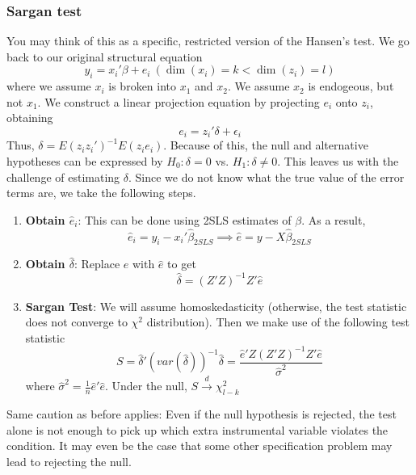 \documentclass[12pt]{article}
\theoremstyle{definition}
\theoremstyle{property}
\theoremstyle{assumption}
\theoremstyle{example}
\theoremstyle{comment}
\begin{document}
\subsubsection{Sargan test}
You may think of this as a specific, restricted version of the Hansen's test. We go back to our original structural equation
\[
y_i = x_i'\beta+e_i \ (\dim(x_i)=k<\dim(z_i)=l) 
\]
where we assume $x_i$ is broken into $x_1$ and $x_2$. We assume $x_2$ is endogeous, but not $x_1$. We construct a linear projection equation by projecting $e_i$ onto $z_i$, obtaining
\[
e_i=z_i'\delta+\epsilon_i
\]
Thus, $\delta=E(z_iz_i')^{-1}E(z_ie_i)$.  Because of this, the null and alternative hypotheses can be expressed by $H_0: \delta=0$ vs. $H_1: \delta\neq0$. This leaves us with the challenge of estimating $\delta$.  Since we do not know what the true value of the error terms are, we take the following steps.
\begin{enumerate}
\item \textbf{Obtain $\hat{e}_i$}: This can be done using 2SLS estimates of $\beta$. As a result, 
\[
\hat{e}_i = y_i-x_i'\hat{\beta}_{2SLS} \implies \hat{e}=y-X\hat{\beta}_{2SLS}
\]
\item \textbf{Obtain $\hat{\delta}$}: Replace $e$ with $\hat{e}$ to get
\[
\hat{\delta} = (Z'Z)^{-1}Z'\hat{e}
\]
\item \textbf{Sargan Test}: We will assume homoskedasticity (otherwise, the test statistic does not converge to $\chi^2$ distribution). Then we make use of the following test statistic
\[
S=\hat{\delta}'(var(\hat{\delta}))^{-1}\hat{\delta}=\frac{\hat{e}'Z(Z'Z)^{-1}Z'\hat{e}}{\hat{\sigma}^2}
\]
where $\hat{\sigma}^2=\frac{1}{n}\hat{e}'\hat{e}$. Under the null, $S\xrightarrow{d}\chi_{l-k}^2$
\end{enumerate} \par
Same caution as before applies: Even if the null hypothesis is rejected, the test alone is not enough to pick up which extra instrumental variable violates the condition. It may even be the case that some other specification problem may lead to rejecting the null. 
\end{document}
